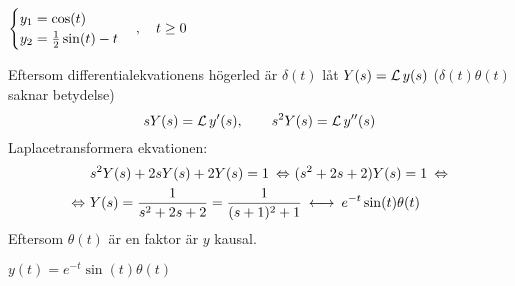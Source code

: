 \begin{task}{5.4}
	\ans 
	$\begin{cases}
	y_1=\cos(t) \\
	y_2=\frac{1}{2}\sin(t)-t
	\end{cases}, \quad t \ge 0$
\end{task}

\begin{task}{5.5}
	Eftersom differentialekvationens högerled är $\delta(t)$ låt $Y(s)=\operatorname{\mathcal{L}} y(s)$ ($\delta(t)\theta(t)$ saknar betydelse)
	\[sY(s)=\operatorname{\mathcal{L}} y'(s),\qquad s^2Y(s)=\operatorname{\mathcal{L}} y''(s)\]
	Laplacetransformera ekvationen:
	\begin{align*}
	&s^2Y(s)+2sY(s)+2Y(s)=1 \lra
	(s^2+2s+2)Y(s)=1\lra \\ \lra
	&Y(s)=\frac{1}{s^2+2s+2}=
	\frac{1}{(s+1)^2+1}\llra
	e^{-t}\sin(t)\theta(t)
	\end{align*}
	Eftersom $\theta(t)$ är en faktor är $y$ kausal.
	
	\ans $y(t)=e^{-t}\sin(t)\theta(t)$
\end{task}

